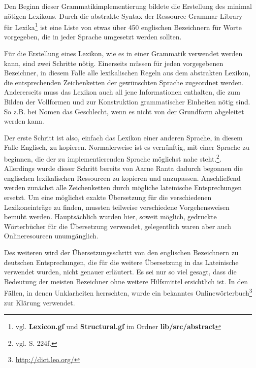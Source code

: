 Den Beginn dieser Grammatikimplementierung bildete die Erstellung des minimal nötigen Lexikons. Durch die abstrakte Syntax der Ressource Grammar Library für Lexika\footnote{vgl. \textbf{Lexicon.gf} und \textbf{Structural.gf} im Ordner \textbf{lib/src/abstract}} ist eine Liste von etwas über 450 englischen Bezeichnern für Worte vorgegeben, die in jeder Sprache umgesetzt werden sollten. \par
Für die Erstellung eines Lexikon, wie es in einer Grammatik verwendet werden kann, sind zwei Schritte nötig. Einerseits müssen für jeden vorgegebenen Bezeichner, in diesem Falle alle lexikalischen Regeln aus dem abstrakten Lexikon, die entsprechenden Zeichenketten der gewünschten Sprache zugeordnet werden. Andererseits muss das Lexikon auch all jene Informationen enthalten, die zum Bilden der Vollformen und zur Konstruktion grammatischer Einheiten nötig sind. So z.B. bei Nomen das Geschlecht, wenn es nicht von der Grundform abgeleitet werden kann. \par
Der erste Schritt ist also, einfach das Lexikon einer anderen Sprache, in diesem Falle Englisch, zu kopieren. Normalerweise ist es vernünftig, mit einer Sprache zu beginnen, die der zu implementierenden Sprache möglichst nahe steht.\footnote{vgl. \cite{RANTA2011} S. 224f.}. Allerdings wurde dieser Schritt bereits von Aarne Ranta dadurch begonnen die englischen lexikalischen Ressourcen zu kopieren und anzupassen. Anschließend werden zunächst alle Zeichenketten durch mögliche lateinische Entsprechungen ersetzt. Um eine möglichst exakte Übersetzung für die verschiedenen Lexikoneinträge zu finden, mussten teilweise verschiedene Vorgehensweisen bemüht werden. Hauptsächlich wurden hier, soweit möglich, gedruckte Wörterbücher für die Übersetzung verwendet, gelegentlich waren aber auch Onlineresourcen unumgänglich. \par
Des weiteren wird der Übersetzungsschritt von den englischen Bezeichnern zu deutschen Entsprechungen, die für die weitere Übersetzung in das Lateinische verwendet wurden, nicht genauer erläutert. Es sei nur so viel gesagt, dass die Bedeutung der meisten Bezeichner ohne weitere Hilfsmittel ersichtlich ist. In den Fällen, in denen Unklarheiten herrschten, wurde ein bekanntes Onlinewörterbuch\footnote{\url{http://dict.leo.org/}} zur Klärung verwendet.\par
